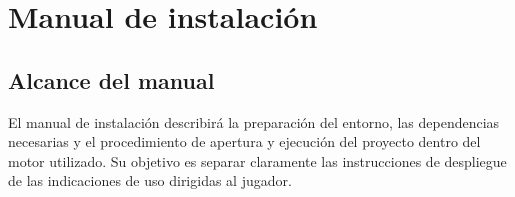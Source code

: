 \chapter{Manual de instalación}

\begin{abstract}
Este capítulo se reserva para documentar los pasos necesarios para desplegar y ejecutar
\textit{Via Inferni} en un entorno local de desarrollo o de demostración.
\end{abstract}

\section{Alcance del manual}
El manual de instalación describirá la preparación del entorno, las dependencias necesarias
y el procedimiento de apertura y ejecución del proyecto dentro del motor utilizado. Su
objetivo es separar claramente las instrucciones de despliegue de las indicaciones de uso
dirigidas al jugador.
